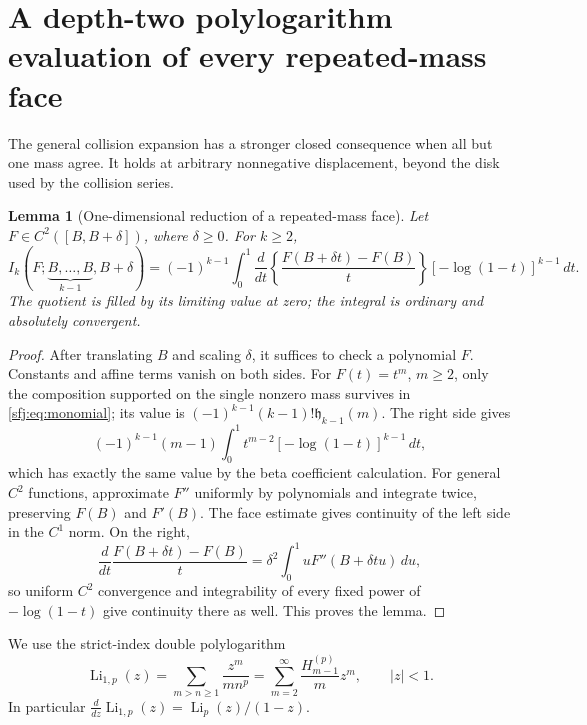 \documentclass[11pt,letterpaper]{article}
\numberwithin{equation}{section}
\newtheorem{lemma}[theorem]{Lemma}
\theoremstyle{definition}
\theoremstyle{remark}
\DeclareMathOperator{\Li}{Li}
\begin{document}
\section{A depth-two polylogarithm evaluation of every repeated-mass face}
\label{sfj:sec:polylog}

The general collision expansion has a stronger closed consequence when
all but one mass agree.  It holds at arbitrary nonnegative displacement,
beyond the disk used by the collision series.

\begin{lemma}[One-dimensional reduction of a repeated-mass face]
\label{sfj:lem:repeated}
Let $F\in C^2([B,B+\delta])$, where $\delta\ge0$.  For $k\ge2$,
\begin{equation}\label{sfj:eq:one-dimensional}
 \boxed{\displaystyle
 I_k(F;\underbrace{B,\ldots,B}_{k-1},B+\delta)
  =(-1)^{k-1}\int_0^1
   \frac{d}{dt}\left\{\frac{F(B+\delta t)-F(B)}t\right\}
                            [-\log(1-t)]^{k-1}\,dt.}
\end{equation}
The quotient is filled by its limiting value at zero; the integral is
ordinary and absolutely convergent.
\end{lemma}
\begin{proof}
After translating $B$ and scaling $\delta$, it suffices to check a
polynomial $F$.  Constants and affine terms vanish on both sides.
For $F(t)=t^m$, $m\ge2$, only the composition supported on the single
nonzero mass survives in \eqref{sfj:eq:monomial}; its value is
$(-1)^{k-1}(k-1)!\mathfrak h_{k-1}(m)$.  The right side gives
\[
 (-1)^{k-1}(m-1)\int_0^1
           t^{m-2}[-\log(1-t)]^{k-1}\,dt,
\]
which has exactly the same value by the beta coefficient calculation.
For general $C^2$ functions, approximate $F''$ uniformly by
polynomials and integrate twice, preserving $F(B)$ and $F'(B)$.
The face estimate gives continuity of the left side in the $C^1$
norm.  On the right,
\[
 \frac{d}{dt}\frac{F(B+\delta t)-F(B)}t
       =\delta^2\int_0^1 uF''(B+\delta tu)\,du,
\]
so uniform $C^2$ convergence and integrability of every fixed power of
$-\log(1-t)$ give continuity there as well.  This proves the lemma.
\end{proof}

We use the strict-index double polylogarithm
\begin{equation}\label{sfj:eq:double-polylog}
 \Li_{1,p}(z)=\sum_{m>n\ge1}\frac{z^m}{m n^p}
    =\sum_{m=2}^\infty\frac{H_{m-1}^{(p)}}m z^m,
     \qquad |z|<1.
\end{equation}
In particular
$\frac{d}{dz}\Li_{1,p}(z)=\Li_p(z)/(1-z)$.
\end{document}
